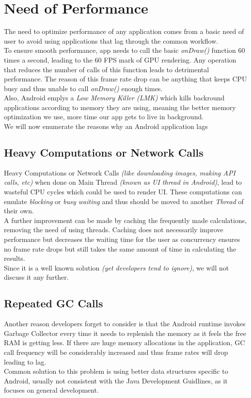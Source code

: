 \documentclass[journal]{IEEEtran}
\begin{document}
\section{Need of Performance}
The need to optimize performance of any application comes from a basic need of user to avoid using applications that lag through the common workflow.\\
To ensure smooth performance, app needs to call the basic \emph{onDraw()} function 60 times a second, leading to the 60 FPS mark of GPU rendering. Any operation that reduces the number of calls of this function leads to detrimental performance. The reason of this frame rate drop can be anything that keeps CPU busy and thus unable to call \emph{onDraw()} enough times.\\
Also, Android emplys a \emph{Low Memory Killer (LMK)} which kills backround applications according to memory they are using, meaning the better memory optimization we use, more time our app gets to live in background.\\
We will now enumerate the reasons why an Android application lags

\newpage

\subsection{Heavy Computations or Network Calls}
Heavy Computations or Network Calls \emph{(like downloading images, making API calls, etc)} when done on Main Thread \emph{(known as UI thread in Android)}, lead to wasteful CPU cycles which could be used to render UI. These computations can emulate \emph{blocking} or \emph{busy waiting} and thus should be moved to another \emph{Thread} of their own.\\
A further improvement can be made by caching the frequently made calculations, removing the need of using threads. Caching does not necessarily improve performance but decreases the waiting time for the user as concurrency ensures no frame rate drops but still takes the same amount of time in calculating the results.\\
Since it is a well known solution \emph{(yet developers tend to ignore)}, we will not discuss it any further.

\subsection{Repeated GC Calls}
Another reason developers forget to consider is that the Android runtime invokes Garbage Collector every time it needs to replenish the memory as it feels the free RAM is getting less. If there are huge memory allocations in the application, GC call frequency will be considerably increased and thus frame rates will drop leading to lag.\\
Common solution to this problem is using better data structures specific to Android, usually not consistent with the Java Development Guidlines, as it focuses on general development.
\end{document}
